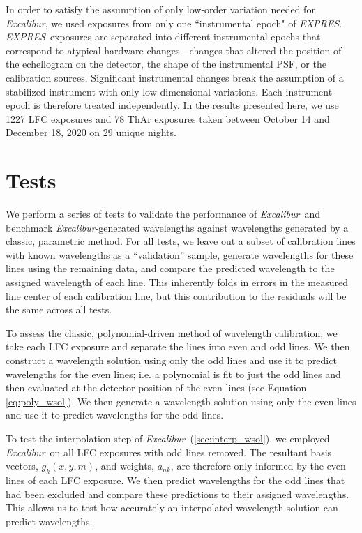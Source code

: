 \documentclass[modern]{aastex63}
\newcommand{\project}[1]{\textsl{#1}}
\newcommand{\name}{\project{Excalibur}}
\newcommand{\acronym}[1]{{\small{#1}}}
\newcommand{\expres}{\project{\acronym{EXPRES}}}
\begin{document}
In order to satisfy the assumption of only low-order variation needed for \name, we used exposures from only one ``instrumental epoch" of \expres.  \expres\ exposures are separated into different instrumental epochs that correspond to atypical hardware changes---changes that altered the position of the echellogram on the detector, the shape of the instrumental PSF, or the calibration sources.  Significant instrumental changes break the assumption of a stabilized instrument with only low-dimensional variations.  Each instrument epoch is therefore treated independently.  In the results presented here, we use 1227 LFC exposures and 78 ThAr exposures taken between October 14 and December 18, 2020 on 29 unique nights.


\section{Tests}\label{sec:tests}
We perform a series of tests to validate the performance of \name\ and benchmark \name -generated wavelengths against wavelengths generated by a classic, parametric method.  For all tests, we leave out a subset of calibration lines with known wavelengths as a ``validation'' sample, generate wavelengths for these lines using the remaining data, and compare the predicted wavelength to the assigned wavelength of each line.  This inherently folds in errors in the measured line center of each calibration line, but this contribution to the residuals will be the same across all tests.

To assess the classic, polynomial-driven method of wavelength calibration, we take each LFC exposure and separate the lines into even and odd lines.  We then construct a wavelength solution using only the odd lines and use it to predict wavelengths for the even lines; i.e. a polynomial is fit to just the odd lines and then evaluated at the detector position of the even lines (see Equation \ref{eq:poly_wsol}).  We then generate a wavelength solution using only the even lines and use it to predict wavelengths for the odd lines.

To test the interpolation step of \name\ (\textsection \ref{sec:interp_wsol}), we employed \name\ on all LFC exposures with odd lines removed.  The resultant basis vectors, $g_k(x,y,m)$,  and weights, $a_{nk}$, are therefore only informed by the even lines of each LFC exposure.  We then predict wavelengths for the odd lines that had been excluded and compare these predictions to their assigned wavelengths.  This allows us to test how accurately an interpolated wavelength solution can predict wavelengths.
\end{document}
